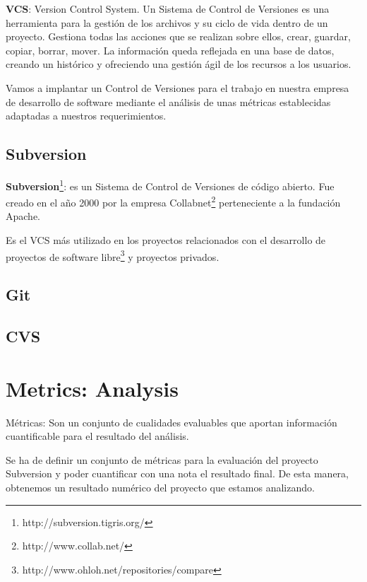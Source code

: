 \documentclass[11pt]{scrartcl}
\begin{document}
\par \textbf{VCS}: Version Control System. Un Sistema de Control de Versiones es una herramienta para la gesti\'on de los archivos y su ciclo de vida dentro de un proyecto. Gestiona todas las acciones que se realizan sobre ellos, crear, guardar, copiar, borrar, mover. La informaci\'on queda reflejada en una base de datos, creando un hist\'orico y ofreciendo una gesti\'on \'agil de los recursos a los usuarios.

\par Vamos a implantar un Control de Versiones para el trabajo en nuestra empresa de desarrollo de software mediante el an\'alisis de unas m\'etricas establecidas adaptadas a nuestros requerimientos.

\subsection{Subversion}

\textbf{Subversion}\footnote{http://subversion.tigris.org/}: es un Sistema de Control de Versiones de c\'odigo abierto. Fue creado en el a\~no 2000 por la empresa Collabnet\footnote{http://www.collab.net/} perteneciente a la fundaci\'on Apache.

\par Es el VCS m\'as utilizado en los proyectos relacionados con el desarrollo de proyectos de software libre\footnote{http://www.ohloh.net/repositories/compare} y proyectos privados.

\subsection{Git}


\subsection{CVS}


\section{Metrics: Analysis}

M\'etricas: Son un conjunto de cualidades evaluables que aportan informaci\'on cuantificable para el resultado del an\'alisis.

\par Se ha de definir un conjunto de m\'etricas para la evaluaci\'on del proyecto Subversion y poder cuantificar con una nota el resultado final. De esta manera, obtenemos un resultado num\'erico del proyecto que estamos analizando.
\end{document}
